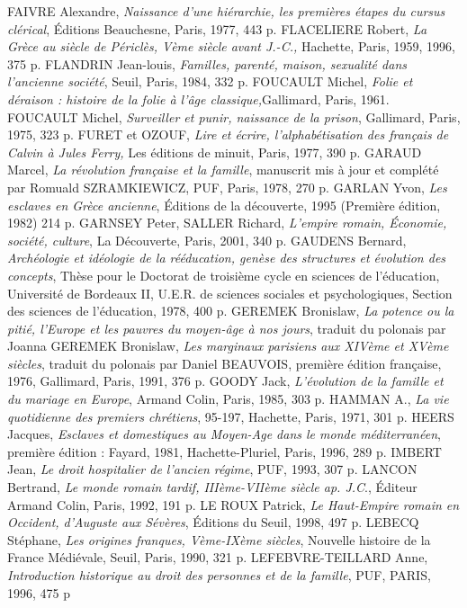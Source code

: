 FAIVRE Alexandre, \emph{Naissance d'une hiérarchie, les premières étapes du cursus clérical}, Éditions Beauchesne, Paris, 1977, 443 p.
FLACELIERE Robert, \emph{La Grèce au siècle de Périclès, Vème siècle avant J.-C.,} Hachette, Paris, 1959, 1996, 375 p.
FLANDRIN Jean-louis, \emph{Familles, parenté, maison, sexualité dans l'ancienne société}, Seuil, Paris, 1984, 332 p.
FOUCAULT Michel, \emph{Folie et déraison : histoire de la folie à l'âge classique,}Gallimard, Paris, 1961. 
FOUCAULT Michel, \emph{Surveiller et punir, naissance de la prison}, Gallimard, Paris, 1975, 323 p.
FURET et OZOUF, \emph{Lire et écrire, l'alphabétisation des français de Calvin à Jules Ferry,} Les éditions de minuit, Paris, 1977, 390 p.
GARAUD Marcel, \emph{La révolution française et la famille}, manuscrit mis à jour et complété par Romuald SZRAMKIEWICZ, PUF, Paris, 1978, 270 p.
GARLAN Yvon, \emph{Les esclaves en Grèce ancienne}, Éditions de la découverte, 1995 (Première édition, 1982) 214 p.
GARNSEY Peter, SALLER Richard, \emph{L'empire romain, Économie, société, culture}, La Découverte, Paris, 2001, 340 p.
GAUDENS Bernard, \emph{Archéologie et idéologie de la rééducation, genèse des structures et évolution des concepts}, Thèse pour le Doctorat de troisième cycle en sciences de l'éducation, Université de Bordeaux II, U.E.R. de sciences sociales et psychologiques, Section des sciences de l'éducation, 1978, 400 p.
GEREMEK Bronislaw, \emph{La potence ou la pitié, l'Europe et les pauvres du moyen-âge à nos jours}, traduit du polonais par Joanna
GEREMEK Bronislaw, \emph{Les marginaux parisiens aux XIVème et XVème siècles}, traduit du polonais par Daniel BEAUVOIS, première édition française, 1976, Gallimard, Paris, 1991, 376 p.
GOODY Jack, \emph{L'évolution de la famille et du mariage en Europe}, Armand Colin, Paris, 1985, 303 p.
HAMMAN A., \emph{La vie quotidienne des premiers chrétiens}, 95-197, Hachette, Paris, 1971, 301 p.
HEERS Jacques, \emph{Esclaves et domestiques au Moyen-Age dans le monde méditerranéen}, première édition : Fayard, 1981, Hachette-Pluriel, Paris, 1996, 289 p.
IMBERT Jean, \emph{Le droit hospitalier de l'ancien régime}, PUF, 1993, 307 p.
LANCON Bertrand, \emph{Le monde romain tardif, IIIème-VIIème siècle ap. J.C}., Éditeur Armand Colin, Paris, 1992, 191 p. 
LE ROUX Patrick, \emph{Le Haut-Empire romain en Occident, d'Auguste aux Sévères}, Éditions du Seuil, 1998, 497 p.
LEBECQ Stéphane, \emph{Les origines franques, Vème-IXème siècles}, Nouvelle histoire de la France Médiévale, Seuil, Paris, 1990, 321 p.
LEFEBVRE-TEILLARD Anne, \emph{Introduction historique au droit des personnes et de la famille}, PUF, PARIS, 1996, 475 p
